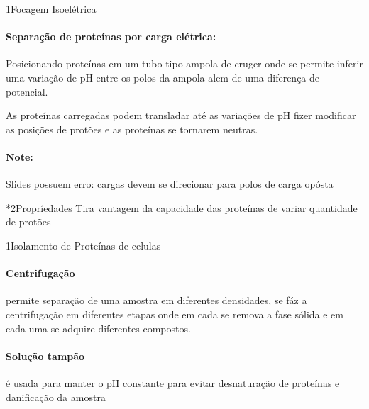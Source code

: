 \documentclass[\mainfilename]{subfiles}
\begin{document}

\begin{sectionBox}1{Focagem Isoelétrica}
    
    \paragraph{Separação de proteínas por carga elétrica:}
    Posicionando proteínas em um tubo tipo ampola de cruger onde se permite inferir uma variação de pH entre os polos da ampola alem de uma diferença de potencial.
    
    As proteínas carregadas podem transladar até as variações de pH fizer modificar as posições de protões e as proteínas se tornarem neutras.

    \vspace{2ex}

    \paragraph{Note:} Slides possuem erro: cargas devem se direcionar para polos de carga opósta

    \begin{sectionBox}*2{Propríedades}
        Tira vantagem da capacidade das proteínas de variar quantidade de protões 
    \end{sectionBox}
    
\end{sectionBox}

\begin{sectionBox}1{Isolamento de Proteínas de celulas}
    
    \paragraph{Centrifugação} permite separação de uma amostra em diferentes densidades, se fáz a centrifugação em diferentes etapas onde em cada se remova a fase sólida e em cada uma se adquire diferentes compostos.

    \vspace{2ex}

    \paragraph{Solução tampão} é usada para manter o pH constante para evitar desnaturação de proteínas e danificação da amostra
    
\end{sectionBox}
\end{document}
